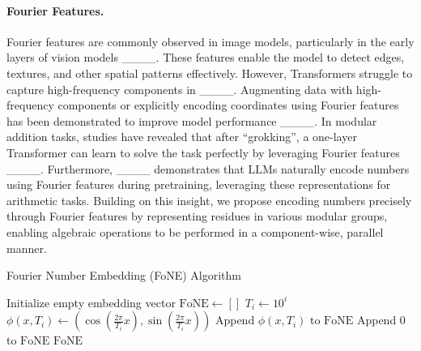 \paragraph{Fourier Features.}
Fourier features are commonly observed in image models, particularly in the early layers of vision models ____. These features enable the model to detect edges, textures, and other spatial patterns effectively. 
However, Transformers struggle to capture high-frequency components in ____. Augmenting data with high-frequency components or explicitly encoding coordinates using Fourier features has been demonstrated to improve model performance ____. 
In modular addition tasks, studies have revealed that after “grokking”, a one-layer Transformer can learn to solve the task perfectly by leveraging Fourier features ____. Furthermore, ____  demonstrates that LLMs naturally encode numbers using Fourier features during pretraining, leveraging these representations for arithmetic tasks. Building on this insight, we propose encoding numbers precisely through Fourier features by representing residues in various modular groups, enabling algebraic operations to be performed in a component-wise, parallel manner.

\ifdefined\isarxiv

\else
\begin{algorithm*}[!ht]
\caption{Fourier Number Embedding (FoNE) Algorithm}\label{alg:fne_algorithm_fixed}
    \begin{algorithmic}[1]
    \State Initialize empty embedding vector $\text{FoNE} \gets []$
     
        \State $T_i \gets 10^i$ 
        \State $\phi(x, T_i) \gets (\cos(\tfrac{2\pi}{T_i} x), \sin(\tfrac{2\pi}{T_i} x))$ 
        \State Append $\phi(x, T_i)$ to $\text{FoNE}$ 
    \EndFor
     
        \State Append $0$ to $\text{FoNE}$ 
    \EndWhile
    \State \Return $\text{FoNE}$ 
    \EndProcedure
    \end{algorithmic}
\end{algorithm*}
\fi